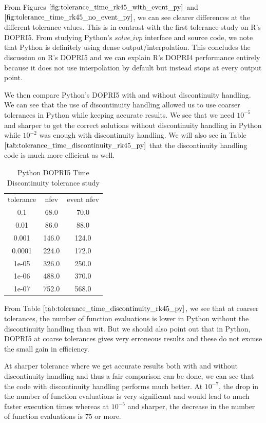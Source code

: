 From Figures $\ref{fig:tolerance_time_rk45_with_event_py}$ and $\ref{fig:tolerance_time_rk45_no_event_py}$, we can see clearer differences at the different tolerance values. This is in contrast with the first tolerance study on R's DOPRI5. From studying Python's $solve\_ivp$ interface and source code, we note that Python is definitely using dense output/interpolation. This  concludes the discussion on R's DOPRI5 and we can explain R's DOPRI4 performance entirely because it does not use interpolation by default but instead stops at every output point.

We then compare Python's DOPRI5 with and without discontinuity handling. We can see that the use of discontinuity handling allowed us to use coarser tolerances in Python while keeping accurate results. We see that we need $10^{-5}$ and sharper to get the correct solutions without discontinuity handling in Python while $10^{-2}$ was enough with discontinuity handling. We will also see in Table $\ref{tab:tolerance_time_discontinuity_rk45_py}$ that the discontinuity handling code is much more efficient as well.


\begin{table}[h]
\caption {Python DOPRI5 Time Discontinuity tolerance study} \label{tab:tolerance_time_discontinuity_rk45_py} 
\begin{center}
\begin{tabular}{ c c c }
tolerance & nfev & event nfev \\ 
0.1   & 68.0  & 70.0  \\
0.01  & 86.0  & 88.0  \\
0.001 & 146.0 & 124.0 \\
0.0001& 224.0 & 172.0 \\
1e-05 & 326.0 & 250.0 \\
1e-06 & 488.0 & 370.0 \\
1e-07 & 752.0 & 568.0 \\
\end{tabular}
\end{center}
\end{table}

From Table $\ref{tab:tolerance_time_discontinuity_rk45_py}$, we see that at coarser tolerances, the number of function evaluations is lower in Python without the discontinuity handling than wit. But we should also point out that in Python, DOPRI5 at coarse tolerances gives very erroneous results and these do not excuse the small gain in efficiency.

At sharper tolerance where we get accurate results both with and without discontinuity handling and thus a fair comparison can be done, we can see that the code with discontinuity handling performs much better. At $10^{-7}$, the drop in the number of function evaluations is very significant and would lead to much faster execution times whereas at $10^{-5}$ and sharper, the decrease in the number of function evaluations is 75 or more.

